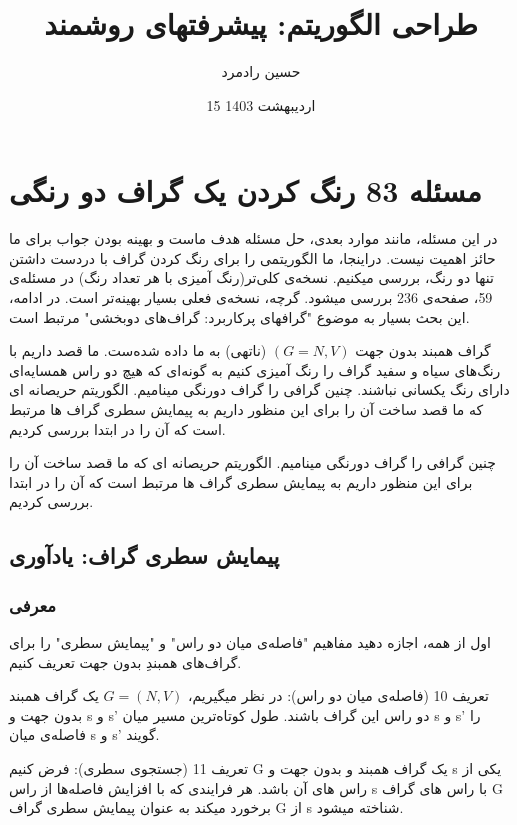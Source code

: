 \documentclass{book} %
\begin{document}
\title{طراحی الگوریتم: پیشرفتهای روشمند}
\author{حسین رادمرد}
\date{15 اردیبهشت 1403}

\maketitle

\section{مسئله 83 رنگ کردن یک گراف دو رنگی}

در این مسئله، مانند موارد بعدی، حل مسئله هدف ماست و بهینه بودن جواب برای ما حائز اهمیت نیست. دراینجا، ما الگوریتمی را برای رنگ کردن گراف با دردست داشتن تنها دو رنگ، بررسی میکنیم. نسخه‌ی کلی‌تر(رنگ آمیزی با هر تعداد رنگ) در مسئله‌ی 59، صفحه‌ی 236 بررسی میشود. گرچه، نسخه‌ی فعلی بسیار بهینه‌تر است. در ادامه، این بحث بسیار به موضوع "گرافهای پرکاربرد: گراف‌های دوبخشی" مرتبط است.

گراف همبند بدون جهت 
${(G = N, V)}$
 (ناتهی) به ما داده شده‌ست. ما قصد داریم با رنگ‌های سیاه و سفید گراف را رنگ آمیزی کنیم به گونه‌ای که هیچ دو راس همسایه‌ای دارای رنگ یکسانی نباشند. چنین گرافی را گراف دورنگی مینامیم. الگوریتم حریصانه ای که ما قصد ساخت آن را برای این منظور داریم به پیمایش سطری گراف ها مرتبط است که آن را در ابتدا بررسی کردیم.


 چنین گرافی را گراف دورنگی مینامیم. الگوریتم حریصانه ای که ما قصد ساخت آن را برای این منظور داریم به پیمایش سطری گراف ها مرتبط است که آن را در ابتدا بررسی کردیم.
\subsection*{پیمایش سطری گراف: یادآوری}
\subsubsection*{معرفی}

اول از همه، اجازه دهید مفاهیم "فاصله‌ی میان دو راس" و "پیمایش سطری" را برای گراف‌های همبندِ بدون جهت تعریف کنیم.

تعریف 10 (فاصله‌ی میان دو راس):
در نظر میگیریم، $G = (N, V)$ یک گراف همبند بدون جهت و s و s' دو راس این گراف باشند. طول کوتاه‌ترین مسیر میان s و s' را فاصله‌ی میان s و s' گویند.


تعریف 11 (جستجوی سطری):
فرض کنیم G یک گراف همبند و بدون جهت و s یکی از راس های آن باشد. هر فرایندی که با افزایش فاصله‌ها از راس s با راس های گراف G برخورد میکند به عنوان پیمایش سطری گراف G از s شناخته میشود.  
\end{document}
